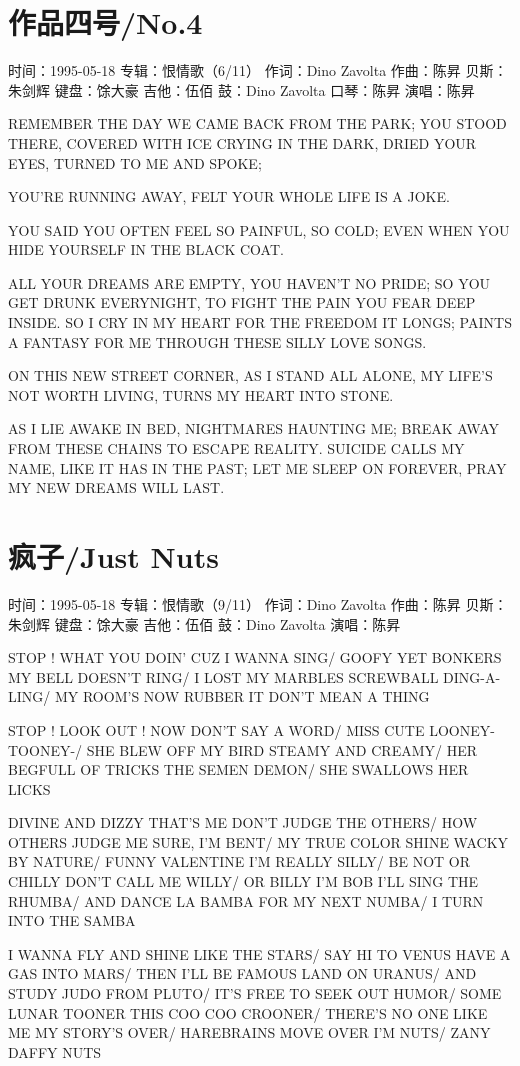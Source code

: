 \documentclass[UTF8,a4paper,oneside,twocolumn,12pt]{ctexbook}
\newcommand{\infopair}[2]{\textbullet #1：#2}
\newcommand{\zc}[1][伍佰]{\infopair{作词}{#1}}
\newcommand{\zq}[1][伍佰]{\infopair{作曲}{#1}}
\newcommand{\zj}[1]{\infopair{专辑}{#1}}
\newcommand{\sj}[1]{\infopair{时间}{#1}}
\newenvironment{info}{\begin{flushleft}\kaishu
	}
	{\end{flushleft}\normalsize\yahei\par}
\newenvironment{lyric}{
	}
{}
\begin{document}
\section{作品四号/No.4}
\begin{info}
	\sj{1995-05-18}
	\zj{恨情歌（6/11）}
	\zc[Dino Zavolta]
	\zq[陈昇]
	\infopair{贝斯}{朱剑辉}
	\infopair{键盘}{馀大豪}
	\infopair{吉他}{伍佰}
	\infopair{鼓}{Dino Zavolta}
	\infopair{口琴}{陈昇}
	\infopair{演唱}{陈昇}
\end{info}
\begin{lyric}
	REMEMBER THE DAY
	WE CAME BACK FROM THE PARK;
	YOU STOOD THERE, COVERED WITH ICE
	CRYING IN THE DARK,
	DRIED YOUR EYES,
	TURNED TO ME AND SPOKE;

	YOU'RE RUNNING AWAY,
	FELT YOUR WHOLE LIFE IS A JOKE.

	YOU SAID YOU OFTEN
	FEEL SO PAINFUL, SO COLD;
	EVEN WHEN YOU HIDE YOURSELF
	IN THE BLACK COAT.

	ALL YOUR DREAMS ARE EMPTY,
	YOU HAVEN'T NO PRIDE;
	SO YOU GET DRUNK EVERYNIGHT,
	TO FIGHT THE PAIN YOU FEAR DEEP INSIDE.
	SO I CRY IN MY HEART
	FOR THE FREEDOM IT LONGS;
	PAINTS A FANTASY FOR ME
	THROUGH THESE SILLY LOVE SONGS.

	ON THIS NEW STREET CORNER,
	AS I STAND ALL ALONE,
	MY LIFE'S NOT WORTH LIVING,
	TURNS MY HEART INTO STONE.

	AS I LIE AWAKE IN BED,
	NIGHTMARES HAUNTING ME;
	BREAK AWAY FROM THESE CHAINS
	TO ESCAPE REALITY.
	SUICIDE CALLS MY NAME,
	LIKE IT HAS IN THE PAST;
	LET ME SLEEP ON FOREVER,
	PRAY MY NEW DREAMS WILL LAST.
\end{lyric}

\section{疯子/Just Nuts}
\begin{info}
	\sj{1995-05-18}
	\zj{恨情歌（9/11）}
	\zc[Dino Zavolta]
	\zq[陈昇]
	\infopair{贝斯}{朱剑辉}
	\infopair{键盘}{馀大豪}
	\infopair{吉他}{伍佰}
	\infopair{鼓}{Dino Zavolta}
	\infopair{演唱}{陈昇}
\end{info}
\begin{lyric}
	STOP ! WHAT YOU DOIN' CUZ I WANNA SING/
	GOOFY YET BONKERS MY BELL DOESN'T RING/
	I LOST MY MARBLES SCREWBALL DING-A-LING/
	MY ROOM'S NOW RUBBER IT DON'T MEAN A THING

	STOP ! LOOK OUT ! NOW DON'T SAY A WORD/
	MISS CUTE LOONEY-TOONEY-/
	SHE BLEW OFF MY BIRD STEAMY AND CREAMY/
	HER BEGFULL OF TRICKS THE SEMEN DEMON/
	SHE SWALLOWS HER LICKS

	DIVINE AND DIZZY THAT'S ME DON'T JUDGE THE OTHERS/
	HOW OTHERS JUDGE ME SURE, I'M BENT/
	MY TRUE COLOR SHINE WACKY BY NATURE/
	FUNNY VALENTINE I'M REALLY SILLY/
	BE NOT OR CHILLY DON'T CALL ME WILLY/
	OR BILLY I'M BOB I'LL SING THE RHUMBA/
	AND DANCE LA BAMBA FOR MY NEXT NUMBA/
	I TURN INTO THE SAMBA

	I WANNA FLY AND SHINE LIKE THE STARS/
	SAY HI TO VENUS HAVE A GAS INTO MARS/
	THEN I'LL BE FAMOUS LAND ON URANUS/
	AND STUDY JUDO FROM PLUTO/
	IT'S FREE TO SEEK OUT HUMOR/
	SOME LUNAR TOONER THIS COO COO CROONER/
	THERE'S NO ONE LIKE ME MY STORY'S OVER/
	HAREBRAINS MOVE OVER I'M NUTS/
	ZANY DAFFY NUTS
\end{lyric}
\end{document}
